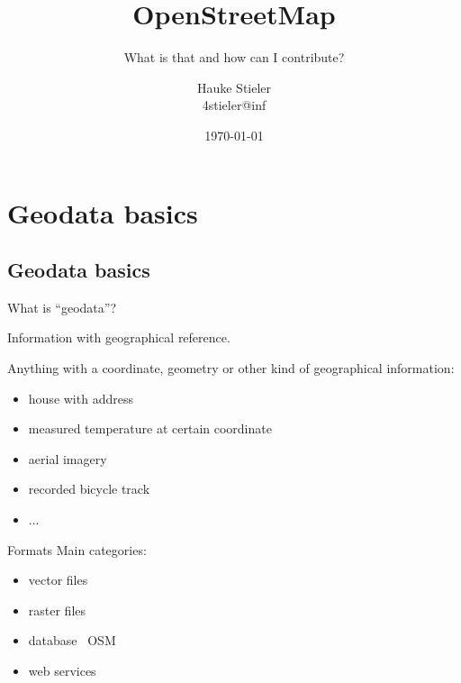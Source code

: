 \documentclass{beamer}
\title{OpenStreetMap}
\subtitle{What is that and how can I contribute?}
\author{Hauke Stieler\\4stieler@inf}
\date{\today}
\begin{document}
	\maketitle
	
	\begin{frame}
		\tableofcontents
	\end{frame}
	
	\section{Geodata basics}
	
		\subsection{Geodata basics}
	
		\begin{frame}{What is \enquote{geodata}?}
			\begin{definition}
				Information with geographical reference.
			\end{definition}
			\pause
			Anything with a coordinate, geometry or other kind of geographical information:
			\begin{itemize}
				\item house with address\pause
				\item measured temperature at certain coordinate\pause
				\item aerial imagery\pause
				\item recorded bicycle track\pause
				\item ...
			\end{itemize}
		\end{frame}
		
		\begin{frame}{Formats}
			Main categories:
			\begin{itemize}
				\item vector files\pause
				\item raster files\pause
				\item database \textleftarrow\ OSM\pause
				\item web services
			\end{itemize}
		\end{frame}
		
\end{document}
